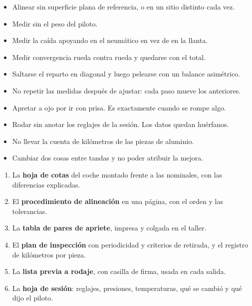 \begin{ojo}
\begin{itemize}
  \item Alinear sin superficie plana de referencia, o en un sitio distinto cada
        vez.
  \item Medir sin el peso del piloto.
  \item Medir la caída apoyando en el neumático en vez de en la llanta.
  \item Medir convergencia rueda contra rueda y quedarse con el total.
  \item Saltarse el reparto en diagonal y luego pelearse con un balance
        asimétrico.
  \item No repetir las medidas después de ajustar: cada paso mueve los
        anteriores.
  \item Apretar a ojo por ir con prisa. Es exactamente cuando se rompe algo.
  \item Rodar sin anotar los reglajes de la sesión. Los datos quedan huérfanos.
  \item No llevar la cuenta de kilómetros de las piezas de aluminio.
  \item Cambiar dos cosas entre tandas y no poder atribuir la mejora.
\end{itemize}
\end{ojo}

\begin{entregable}
\begin{enumerate}
  \item La \textbf{hoja de cotas} del coche montado frente a las nominales, con
        las diferencias explicadas.
  \item El \textbf{procedimiento de alineación} en una página, con el orden y
        las tolerancias.
  \item La \textbf{tabla de pares de apriete}, impresa y colgada en el taller.
  \item El \textbf{plan de inspección} con periodicidad y criterios de retirada,
        y el registro de kilómetros por pieza.
  \item La \textbf{lista previa a rodaje}, con casilla de firma, usada en cada
        salida.
  \item La \textbf{hoja de sesión}: reglajes, presiones, temperaturas, qué se
        cambió y qué dijo el piloto.
\end{enumerate}
\end{entregable}

